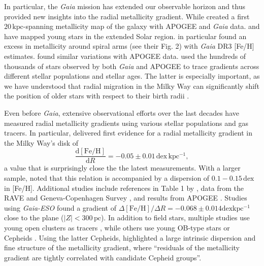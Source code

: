 \documentclass[fleqn,usenatbib]{mnras}
\begin{document}
In particular, the \textit{Gaia} mission \citep{Gaia-Collaboration2016} has extended our observable horizon and thus provided new insights into the radial metallicity gradient. While \citet[][see their Fig. 6]{Hogg2019} created a first $20\,\mathrm{kpc}$-spanning metallicity map of the galaxy with APOGEE and \textit{Gaia} data. \citet{Zari2018, Zari2021} and \citet{Poggio2021, Poggio2022} have mapped young stars in the extended Solar region. \citet{Poggio2022} in particular found an excess in metallicity around spiral arms (see their Fig. 2) with \textit{Gaia} DR3 [Fe/H] estimates. \citet{Hackshaw2024} found similar variations with APOGEE data. \citet{Imig2023} used the hundreds of thousands of stars observed by both \textit{Gaia} and APOGEE to trace gradients across different stellar populations and stellar ages. The latter is especially important, as we have understood that radial migration in the Milky Way can significantly shift the position of older stars with respect to their birth radii \citet{Binney2008, Frankel2018, Frankel2020}.

Even before \textit{Gaia}, extensive observational efforts over the last decades have measured radial metallicity gradients using various stellar populations and gas tracers. In particular, \citet{Janes1979} delivered first evidence for a radial metallicity gradient in the Milky Way's disk of
\begin{equation}
    \frac{\mathrm{d{[Fe/H]}}}{\mathrm{d}R} = -0.05 \pm 0.01\,\mathrm{dex\,kpc^{-1}},
\end{equation}
a value that is surprisingly close the the latest measurements\citep{Anders2017, Hayden2015}. With a larger sample, \citet{Twarog1980} noted that this relation is accompanied by a dispersion of $0.1-0.15\,\mathrm{dex}$ in [Fe/H]. Additional studies include references in Table 1 by \citet{Chiappini2001}, data from the RAVE and Geneva-Copenhagen Survey \citep{Boeche2013}, and results from APOGEE \citep{Anders2014, Cunha2016}. Studies using \textit{Gaia-ESO} \citep{Bergemann2014} found a gradient of $\Delta \mathrm{[Fe/H]} / \Delta R = -0.068 \pm 0.014 \mathrm{dex kpc^{-1}}$ close to the plane ($\vert Z \vert < 300\,\mathrm{pc}$). In addition to field stars, multiple studies use young open clusters as tracers \citep[e.g.][]{Cunha2016, Magrini2017, Casamiquela2019, Donor2020, Spina2021,Myers2022}, while others use young OB-type stars \citep{Zari2018, Zari2021, Poggio2021, Poggio2022} or Cepheids \citep{Andrievsky2002, Andrievsky2002b, Lemasle2007, Lemasle2013}. Using the latter Cepheids, \citet{Genovali2014} highlighted a large intrinsic dispersion and fine structure of the metallicity gradient, where ``residuals of the metallicity gradient are tightly correlated with candidate Cepheid groups''.
\end{document}
